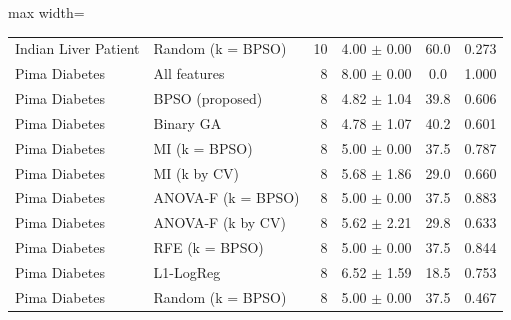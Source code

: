 \begin{table}[!t]
\begin{adjustbox}{max width=\linewidth}
\begin{tabular}{llrccc}
Indian Liver Patient & Random (k = BPSO) & 10 & 4.00 $\pm$ 0.00 & 60.0 & 0.273 \\
Pima Diabetes & All features & 8 & 8.00 $\pm$ 0.00 & 0.0 & 1.000 \\
Pima Diabetes & BPSO (proposed) & 8 & 4.82 $\pm$ 1.04 & 39.8 & 0.606 \\
Pima Diabetes & Binary GA & 8 & 4.78 $\pm$ 1.07 & 40.2 & 0.601 \\
Pima Diabetes & MI (k = BPSO) & 8 & 5.00 $\pm$ 0.00 & 37.5 & 0.787 \\
Pima Diabetes & MI (k by CV) & 8 & 5.68 $\pm$ 1.86 & 29.0 & 0.660 \\
Pima Diabetes & ANOVA-F (k = BPSO) & 8 & 5.00 $\pm$ 0.00 & 37.5 & 0.883 \\
Pima Diabetes & ANOVA-F (k by CV) & 8 & 5.62 $\pm$ 2.21 & 29.8 & 0.633 \\
Pima Diabetes & RFE (k = BPSO) & 8 & 5.00 $\pm$ 0.00 & 37.5 & 0.844 \\
Pima Diabetes & L1-LogReg & 8 & 6.52 $\pm$ 1.59 & 18.5 & 0.753 \\
Pima Diabetes & Random (k = BPSO) & 8 & 5.00 $\pm$ 0.00 & 37.5 & 0.467 \\
\bottomrule
\end{tabular}
\end{adjustbox}
\end{table}

